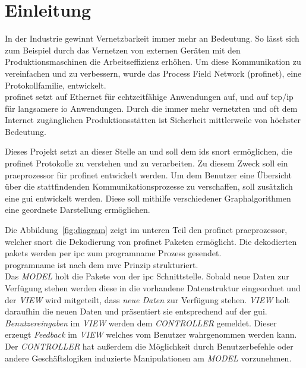 \chapter{Einleitung}

In der Industrie gewinnt Vernetzbarkeit immer mehr an Bedeutung. So lässt sich zum Beispiel durch das Vernetzen von externen Geräten mit den Produktionsmaschinen die Arbeitseffizienz erhöhen. Um diese Kommunikation zu vereinfachen und zu verbessern, wurde das Process Field Network (\gls{profinet}), eine Protokollfamilie, entwickelt.\\
\gls{profinet} setzt auf Ethernet für echtzeitfähige Anwendungen auf, und auf \gls{tcp}/\gls{ip} für langsamere \gls{io} Anwendungen. Durch die immer mehr vernetzten und oft dem Internet zugänglichen Produktionsstätten ist Sicherheit mittlerweile von höchster Bedeutung. \par
Dieses Projekt setzt an dieser Stelle an und soll dem \gls{ids} \gls{snort} ermöglichen, die \gls{profinet} Protokolle zu verstehen und zu verarbeiten. Zu diesem Zweck soll ein \gls{praeprozessor} für \gls{profinet} entwickelt werden. Um dem Benutzer eine Übersicht über die stattfindenden Kommunikationsprozesse zu verschaffen, soll zusätzlich eine \gls{gui} entwickelt werden. Diese soll mithilfe verschiedener Graphalgorithmen eine geordnete Darstellung ermöglichen.\par
Die Abbildung~\ref{fig:diagram} zeigt im unteren Teil den \gls{profinet} \gls{praeprozessor}, welcher \gls{snort} die Dekodierung von \gls{profinet} Paketen ermöglicht. Die dekodierten \glspl{paket} werden per \gls{ipc} zum \gls{programname} Prozess gesendet.\\
\Gls{programname} ist nach dem \gls{mvc} Prinzip strukturiert.\\
Das \textit{MODEL} holt die Pakete von der \gls{ipc} Schnittstelle. Sobald neue Daten zur Verfügung stehen werden diese in die vorhandene Datenstruktur eingeordnet und der \textit{VIEW} wird mitgeteilt, dass \textit{neue Daten} zur Verfügung stehen. \textit{VIEW} holt daraufhin die neuen Daten und präsentiert sie entsprechend auf der \gls{gui}.\\
\textit{Benutzereingaben} im \textit{VIEW} werden dem \textit{CONTROLLER} gemeldet. Dieser erzeugt \textit{Feedback} im \textit{VIEW} welches vom Benutzer wahrgenommen werden kann. Der \textit{CONTROLLER} hat außerdem die Möglichkeit durch Benutzerbefehle oder andere Geschäftslogiken induzierte Manipulationen am \textit{MODEL} vorzunehmen.

